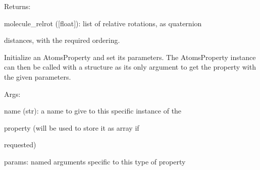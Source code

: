 \documentclass[letterpaper,10pt,english]{sphinxmanual}
\begin{document}
\begin{fulllineitems}
\begin{DUlineblock}{0em}
\item[] Returns:
\item[]
\begin{DUlineblock}{\DUlineblockindent}
\item[] molecule\_relrot ({[}float{]}): list of relative rotations, as quaternion
\item[]
\begin{DUlineblock}{\DUlineblockindent}
\item[] distances, with the required ordering.
\end{DUlineblock}
\end{DUlineblock}
\end{DUlineblock}

Initialize an AtomsProperty and set its parameters.
The AtomsProperty instance can then be called with a structure as its
only argument to get the property with the given parameters.

\begin{DUlineblock}{0em}
\item[] Args:
\item[]
\begin{DUlineblock}{\DUlineblockindent}
\item[] name (str): a name to give to this specific instance of the
\item[]
\begin{DUlineblock}{\DUlineblockindent}
\item[] property (will be used to store it as array if
\item[] requested)
\end{DUlineblock}
\item[] params: named arguments specific to this type of property
\end{DUlineblock}
\end{DUlineblock}

\begin{fulllineitems}
\label{doctree/soprano.properties.linkage.linkage:soprano.properties.linkage.linkage.MoleculeRelativeRotation.default_name}
\end{fulllineitems}


\begin{fulllineitems}
\label{doctree/soprano.properties.linkage.linkage:soprano.properties.linkage.linkage.MoleculeRelativeRotation.default_params}
\end{fulllineitems}


\end{fulllineitems}
\end{document}

